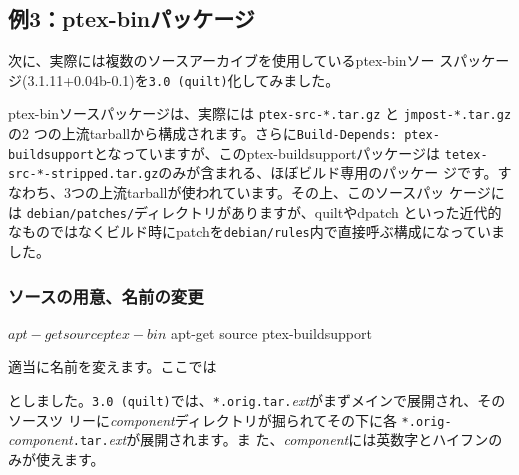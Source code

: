 \documentclass[mingoth,a4paper]{jsarticle}
\begin{document}
\subsection{例3：ptex-binパッケージ}
次に、実際には複数のソースアーカイブを使用しているptex-binソー
スパッケージ(3.1.11+0.04b-0.1)を\verb|3.0 (quilt)|化してみました。

ptex-binソースパッケージは、実際には \verb|ptex-src-*.tar.gz| と \verb|jmpost-*.tar.gz| の2
つの上流tarballから構成されます。さらに\verb|Build-Depends: ptex-buildsupport|となっていますが、このptex-buildsupportパッケージは
\verb|tetex-src-*-stripped.tar.gz|のみが含まれる、ほぼビルド専用のパッケー
ジです。すなわち、3つの上流tarballが使われています。その上、このソースパッ
ケージには \verb|debian/patches/|ディレクトリがありますが、quiltやdpatch
といった近代的なものではなくビルド時にpatchを\verb|debian/rules|内で直接呼ぶ構成になっていま
した。
\subsubsection{ソースの用意、名前の変更}
\begin{commandline}
 $ apt-get source ptex-bin
 $ apt-get source ptex-buildsupport
\end{commandline}
適当に名前を変えます。ここでは
としました。\verb|3.0 (quilt)|では、\verb|*.orig.tar.|\textit{ext}がまずメインで展開され、そのソースツ
リーに\textit{component}ディレクトリが掘られてその下に各
\verb|*.orig-|\textit{component}\verb|.tar.|\textit{ext}が展開されます。ま
た、\textit{component}には英数字とハイフンのみが使えます。
\end{document}
